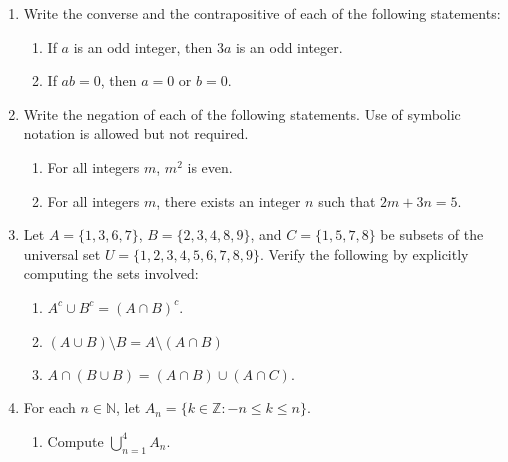 \documentclass[12pt]{article}
\newcommand{\points}[1]{\marginpar{\hspace{24pt}[#1]}}
\newcommand{\di}{\displaystyle}
\newcommand{\N}{\mathbb{N}}
\newcommand{\Z}{\mathbb{Z}}
\begin{document}
\begin{enumerate}
\item Write the converse and the contrapositive of each of the following statements:
\begin{enumerate}

 \item If $a$ is an odd integer, then $3a$ is an odd integer. \points{2}

\vspace{1.75in}

 \item If $ab=0$, then $a=0$ or $b=0$. \points{3}

\vspace{1.75in}
\end{enumerate}
\item Write the negation of each of the following statements. Use of symbolic notation is allowed but not required.
\begin{enumerate}
 \item For all integers $m$, $m^2$ is even.\points{2}

\vspace{1.25in}

 \item For all integers $m$, there exists an integer $n$ such that $2m+3n=5$.\points{3}
\end{enumerate}
\newpage

\item Let $A=\{1,3,6,7\}$, $B=\{2,3,4,8,9\}$, and $C = \{1,5,7,8\}$ be subsets of the universal set $U=\{1,2,3,4,5,6,7,8,9\}$. Verify the following by explicitly computing the sets involved:

\begin{enumerate}

 \item $A^c\cup B^c = (A\cap B)^c$. \points{3}

\vspace{2.5in}

 \item $(A\cup B)\setminus B = A\setminus (A\cap B)$ \points{3}

\vspace{2.5in}

 \item $A\cap (B\cup B) = (A\cap B)\cup (A\cap C)$. \points{4}
\end{enumerate}
\newpage

\item For each $n\in\N$, let $A_n = \{k\in \Z : -n\leq k\leq n\}$.
\begin{enumerate}
 \item Compute $\di \bigcup_{n=1}^4 A_n$. \points{2}


\end{enumerate}
\end{enumerate}
\end{document}
